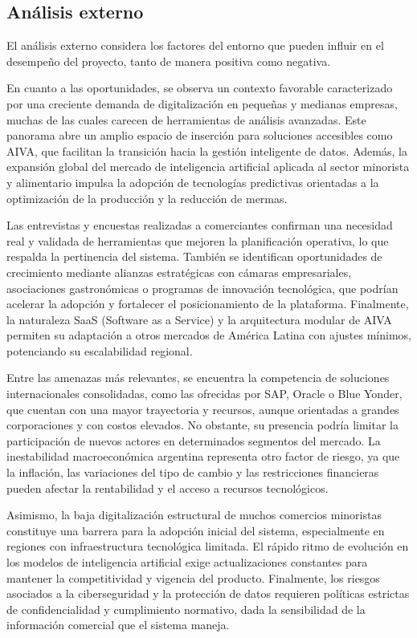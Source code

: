 \subsection{Análisis externo}

El análisis externo considera los factores del entorno que pueden influir en el desempeño del proyecto, tanto de manera positiva como negativa. 

En cuanto a las oportunidades, se observa un contexto favorable caracterizado por una creciente demanda de digitalización en pequeñas y medianas empresas, muchas de las cuales carecen de herramientas de análisis avanzadas. Este panorama abre un amplio espacio de inserción para soluciones accesibles como AIVA, que facilitan la transición hacia la gestión inteligente de datos. Además, la expansión global del mercado de inteligencia artificial aplicada al sector minorista y alimentario impulsa la adopción de tecnologías predictivas orientadas a la optimización de la producción y la reducción de mermas. 

Las entrevistas y encuestas realizadas a comerciantes confirman una necesidad real y validada de herramientas que mejoren la planificación operativa, lo que respalda la pertinencia del sistema. También se identifican oportunidades de crecimiento mediante alianzas estratégicas con cámaras empresariales, asociaciones gastronómicas o programas de innovación tecnológica, que podrían acelerar la adopción y fortalecer el posicionamiento de la plataforma. Finalmente, la naturaleza SaaS (Software as a Service) y la arquitectura modular de AIVA permiten su adaptación a otros mercados de América Latina con ajustes mínimos, potenciando su escalabilidad regional.

Entre las amenazas más relevantes, se encuentra la competencia de soluciones internacionales consolidadas, como las ofrecidas por SAP, Oracle o Blue Yonder, que cuentan con una mayor trayectoria y recursos, aunque orientadas a grandes corporaciones y con costos elevados. No obstante, su presencia podría limitar la participación de nuevos actores en determinados segmentos del mercado. La inestabilidad macroeconómica argentina representa otro factor de riesgo, ya que la inflación, las variaciones del tipo de cambio y las restricciones financieras pueden afectar la rentabilidad y el acceso a recursos tecnológicos. 

Asimismo, la baja digitalización estructural de muchos comercios minoristas constituye una barrera para la adopción inicial del sistema, especialmente en regiones con infraestructura tecnológica limitada. El rápido ritmo de evolución en los modelos de inteligencia artificial exige actualizaciones constantes para mantener la competitividad y vigencia del producto. Finalmente, los riesgos asociados a la ciberseguridad y la protección de datos requieren políticas estrictas de confidencialidad y cumplimiento normativo, dada la sensibilidad de la información comercial que el sistema maneja.

